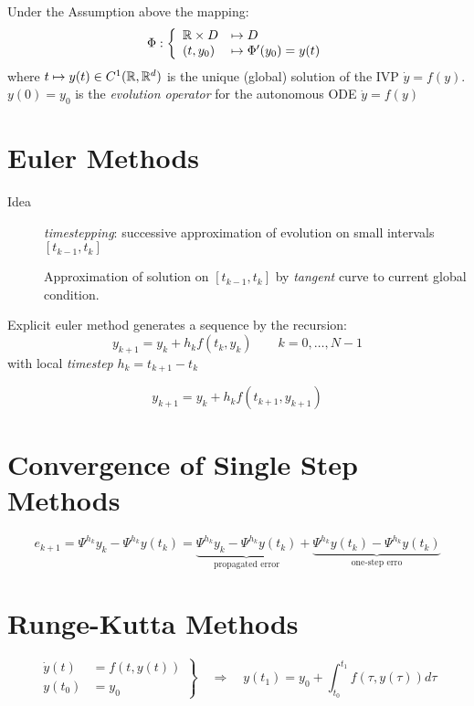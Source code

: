 	\begin{definition}
	 Under the Assumption above the mapping:
		\[
		 \Phi: \left\{ \begin{array}{ll}
		                \mathbb{R} \times D &\mapsto D\\
		                (t,y_0) & \mapsto \Phi'(y_0) = y(t)
		               \end{array} \right.
		\]
	 where $t\mapsto y(t) \in C^1 (\mathbb{R},\mathbb{R}^d)$ is the unique (global) solution of the IVP $\dot y = f(y)$. $y(0) = y_0$ is the \emph{evolution operator} for the autonomous ODE $\dot y = f(y)$
	\end{definition}

\section{Euler Methods}
	\begin{description}
	 \item[Idea] \emph{timestepping}: successive approximation of evolution on small intervals $[t_{k-1},t_k]$
	 
	 Approximation of solution on $[t_{k-1},t_k]$ by \emph{tangent} curve to current global condition.
	 
	\end{description}
	\begin{fmerke} 
	 Explicit euler method generates a sequence by the recursion:
	 \[
	  y_{k+1} = y_k + h_k f(t_k,y_k)\qquad k = 0, \ldots, N-1
	 \]
	 with  local \emph{timestep} $ h_k = t_{k+1}-t_k$
	\end{fmerke}
	
	\begin{fmerke}
	 \[
	  y_{k+1} = y_k + h_k f(t_{k+1},y_{k+1})
	 \]

	\end{fmerke}

\section{Convergence of Single Step Methods}
	\[
	  e_{k+1} = \Psi^{h_k} y_k - \Psi^{h_k} y(t_k)  = 
		\underbrace{\Psi^{h_k}y_k - \Psi^{h_k}y(t_k) }_{\text{propagated error}} + \underbrace{\Psi^{h_k}y(t_k)-\Psi^{h_k}y(t_k)}_{\text{one-step erro}}
	\]


\section{Runge-Kutta Methods}
\[
 \left. \begin{array}{ll}
         \dot y (t) &= f(t,y(t))\\
         y(t_0) &= y_0 
        \end{array} \right\} \quad \Rightarrow \quad y(t_1) = y_0 +\int_{t_0}^{t_1} f(\tau, y(\tau))d\tau
\]
